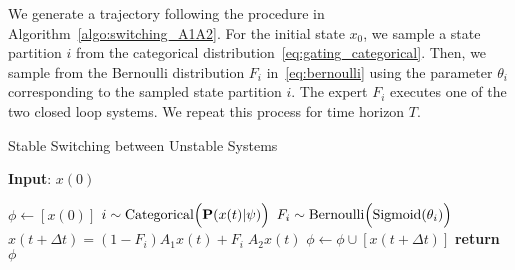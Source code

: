 We generate a trajectory following the procedure in
Algorithm~\eqref{algo:switching_A1A2}.
%
For the initial state $x_0$, we sample a state partition $i$ from the
categorical distribution~\eqref{eq:gating_categorical}.
%
Then, we sample from the Bernoulli distribution $F_i$ in~\eqref{eq:bernoulli} using the
parameter $\theta_i$ corresponding to the sampled state partition $i$.
%
The expert $F_i$ executes one of the two closed loop systems.
%
We repeat this process for time horizon $T$.

\begin{algorithm}
      \caption{Stable Switching between Unstable Systems}
      \label{algo:switching_A1A2}
      \small
      \hspace*{\algorithmicindent} \textbf{Input}: $x(0)$
      \begin{algorithmic}[1]
        \State $\phi \leftarrow  [x(0)]$ 
              \State $i \sim \text{Categorical}\Bigl(\mathbf{P}(x(t)| \psi)\Bigr)$ 
              \State $F_i \sim \text{Bernoulli} \Bigl(\textrm{Sigmoid}(\theta_i) \Bigr)$      
              \State $x(t+\Delta t) = (1-F_i)A_1x(t) + F_i \; A_2x(t) $
              \State $\phi \leftarrow \phi \cup [x(t+\Delta t)]$
            \EndFor
          \State \textbf{return} $\phi$
      \end{algorithmic}
  \end{algorithm}
  
